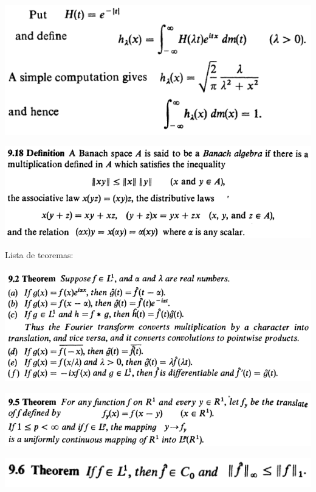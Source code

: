 \documentclass[12pt]{article}
\begin{document}
		\begin{center}
		\includegraphics{d9ponto7}
		\end{center}

		\begin{center}
		\includegraphics{d9ponto18}
		\end{center}

Lista de teoremas:

		\begin{center}
		\includegraphics{9ponto2}
		\end{center}

		\begin{center}
		\includegraphics{9ponto5}
		\end{center}

		\begin{center}
		\includegraphics{9ponto6}
		\end{center}
\end{document}

